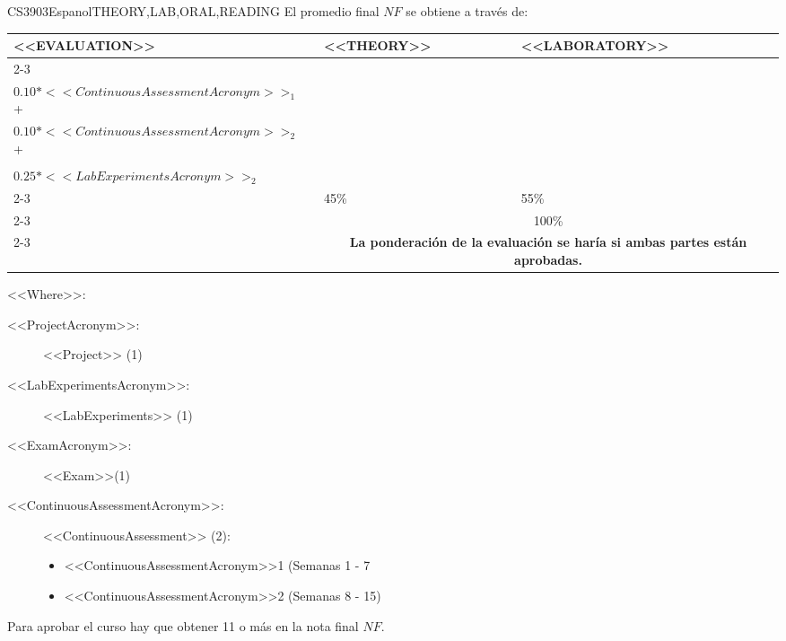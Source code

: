 
  \begin{evaluation}{CS3903}{Espanol}{THEORY,LAB,ORAL,READING}
  El promedio final $NF$ se obtiene a través de:

  \begin{tabularx}{0.9\textwidth}{|X|p{}|p{}|} \hline
  \multirow{4}{*}{\uppercase{<<Evaluation>>}} & \uppercase{<<Theory>>} & \uppercase{<<Laboratory>>} \\ \cline{2-3}
  & %
      \begin{minipage}{0.95\textwidth}
      \begin{tabular}{l}
        $0.25*<<ExamAcronym>>$ + \\
        $0.10*<<ContinuousAssessmentAcronym>>_{1}$  + \\
        $0.10*<<ContinuousAssessmentAcronym>>_{2}$  + \\
      \end{tabular} 
      \end{minipage} 
  & %
      \begin{minipage}{0.95\textwidth}
      \begin{tabular}{l}
        $0.30*<<ProjectAcronym>>_{1}$  + \\
        $0.25*<<LabExperimentsAcronym>>_{2}$  
      \end{tabular} 
      \end{minipage}                 \\ \cline{2-3}
  
  & %
  45\% 
  & %
  55\% \\ \cline{2-3}
  & \multicolumn{2}{c|}{100\%}  \\ \cline{2-3}
  & \multicolumn{2}{c|}{\textbf{La ponderación de la evaluación se haría si ambas partes están aprobadas.}}  \\ \hline
  \end{tabularx}
    
  \vspace{2mm}
  \noindent <<Where>>:
  \begin{description}
    \item[<<ProjectAcronym>>:]  <<Project>> (1)
    \item[<<LabExperimentsAcronym>>:] <<LabExperiments>> (1)
    \item[<<ExamAcronym>>:] <<Exam>>(1)
    \item[<<ContinuousAssessmentAcronym>>:] <<ContinuousAssessment>> (2):
      \begin{itemize}
          \item  <<ContinuousAssessmentAcronym>>1 (Semanas 1 - 7
          \item <<ContinuousAssessmentAcronym>>2 (Semanas 8 - 15) 
      \end{itemize}
  \end{description}
 
  \noindent Para aprobar el curso hay que obtener 11 o más en la nota final $NF$.
  \end{evaluation}
 
